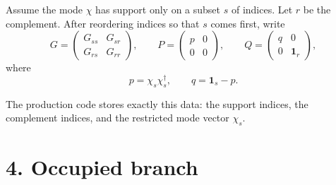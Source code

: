 \documentclass[11pt]{article}
\newcommand{\I}{\mathbf{1}}
\begin{document}
Assume the mode $\chi$ has support only on a subset $s$ of indices. Let $r$ be
the complement. After reordering indices so that $s$ comes first, write
\begin{equation}
G =
\begin{pmatrix}
G_{ss} & G_{sr} \\
G_{rs} & G_{rr}
\end{pmatrix},
\qquad
P =
\begin{pmatrix}
p & 0 \\
0 & 0
\end{pmatrix},
\qquad
Q =
\begin{pmatrix}
q & 0 \\
0 & \I_r
\end{pmatrix},
\end{equation}
where
\begin{equation}
p = \chi_s \chi_s^\dagger,
\qquad
q = \I_s - p.
\end{equation}

The production code stores exactly this data: the support indices, the
complement indices, and the restricted mode vector $\chi_s$.

\section*{4. Occupied branch}
\end{document}
